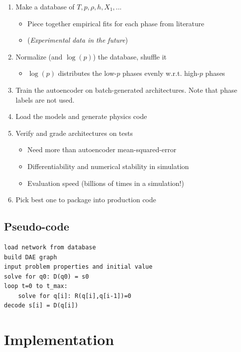 \documentclass[]{article}
\begin{document}
\begin{enumerate}
\def\labelenumi{\arabic{enumi}.}
\item
  Make a database of \(T,p,\rho,h,X_1,...\)

  \begin{itemize}
  \item
    Piece together empirical fits for each phase from literature
  \item
    (\emph{Experimental data in the future})
  \end{itemize}
\item
  Normalize (and \(\log(p)\)) the database, shuffle it

  \begin{itemize}
  \item
    \(\log(p)\) distributes the low-\(p\) phases evenly w.r.t.
    high-\(p\) phases
  \end{itemize}
\item
  Train the autoencoder on batch-generated architectures. Note that
  phase labels are not used.
\item
  Load the models and generate physics code
\item
  Verify and grade architectures on tests

  \begin{itemize}
  \item
    Need more than autoencoder mean-squared-error
  \item
    Differentiability and numerical stability in simulation
  \item
    Evaluation speed (billions of times in a simulation!)
  \end{itemize}
\item
  Pick best one to package into production code
\end{enumerate}

\hypertarget{header-n3353}{%
\subsection{Pseudo-code}\label{header-n3353}}

\begin{verbatim}
load network from database
build DAE graph
input problem properties and initial value
solve for q0: D(q0) = s0
loop t=0 to t_max:
	solve for q[i]: R(q[i],q[i-1])=0
decode s[i] = D(q[i])
\end{verbatim}

\hypertarget{header-n3356}{%
\section{Implementation}\label{header-n3356}}
\end{document}
